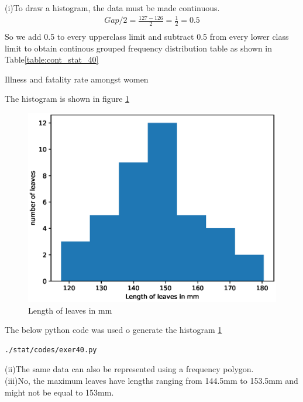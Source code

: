 (i)To draw a histogram, the data must be made continuous.\\
\begin{align}
Gap/2=\frac{127-126}{2}=\frac{1}{2}=0.5\\
\end{align}
So we add 0.5 to every upperclass limit and subtract 0.5 from every lower class limit to obtain continous grouped frequency distribution table as shown in Table\ref{table:cont_stat_40}
\begin{table}[ht!]
\centering

\caption{Illness and fatality rate amongst women}
\label{table:cont_stat_40}
\end{table}
The histogram is shown in figure \ref{fig:hist40_py}
\begin{figure}[!ht]
\centering
\includegraphics[width=\columnwidth]{./stat/codes/pyfigs/exer40.eps}
\caption{Length of leaves in mm}
\label{fig:hist40_py}
\end{figure}
The below python code was used o generate the histogram \ref{fig:hist40_py}
\begin{lstlisting}
./stat/codes/exer40.py
\end{lstlisting}
(ii)The same data can also be represented using a frequency polygon.\\
(iii)No, the maximum leaves have lengths ranging from 144.5mm to 153.5mm and might not be equal to 153mm.\\
